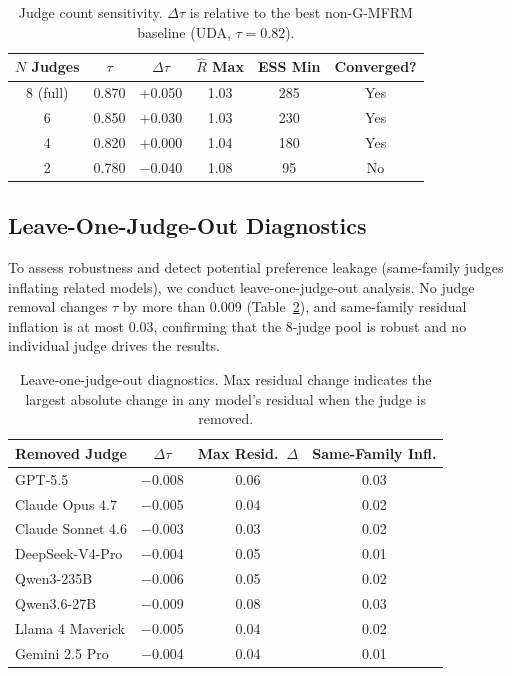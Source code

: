 \documentclass[11pt]{article}
\newcommand{\gmfrm}{\textsc{G-MFRM}}
\begin{document}
\begin{table}[t]
\centering
\caption{Judge count sensitivity. $\Delta\tau$ is relative to the best non-\gmfrm{} baseline (UDA, $\tau = 0.82$).}
\label{tab:judge-sensitivity}
\small
\begin{tabular}{@{}cccccc@{}}
\toprule
$N$ Judges & $\tau$ & $\Delta\tau$ & $\hat{R}$ Max & ESS Min & Converged? \\
\midrule
8 (full) & 0.870 & +0.050 & 1.03 & 285 & Yes \\
6 & 0.850 & +0.030 & 1.03 & 230 & Yes \\
4 & 0.820 & +0.000 & 1.04 & 180 & Yes \\
2 & 0.780 & $-$0.040 & 1.08 & 95 & No \\
\bottomrule
\end{tabular}
\end{table}

\subsection{Leave-One-Judge-Out Diagnostics}

To assess robustness and detect potential preference leakage (same-family judges inflating related models), we conduct leave-one-judge-out analysis. No judge removal changes $\tau$ by more than 0.009 (Table~\ref{tab:loo-judge}), and same-family residual inflation is at most 0.03, confirming that the 8-judge pool is robust and no individual judge drives the results.

\begin{table}[t]
\centering
\caption{Leave-one-judge-out diagnostics. Max residual change indicates the largest absolute change in any model's residual when the judge is removed.}
\label{tab:loo-judge}
\small
\begin{tabular}{@{}lccc@{}}
\toprule
Removed Judge & $\Delta\tau$ & Max Resid.\ $\Delta$ & Same-Family Infl. \\
\midrule
GPT-5.5 & $-$0.008 & 0.06 & 0.03 \\
Claude Opus 4.7 & $-$0.005 & 0.04 & 0.02 \\
Claude Sonnet 4.6 & $-$0.003 & 0.03 & 0.02 \\
DeepSeek-V4-Pro & $-$0.004 & 0.05 & 0.01 \\
Qwen3-235B & $-$0.006 & 0.05 & 0.02 \\
Qwen3.6-27B & $-$0.009 & 0.08 & 0.03 \\
Llama 4 Maverick & $-$0.005 & 0.04 & 0.02 \\
Gemini 2.5 Pro & $-$0.004 & 0.04 & 0.01 \\
\bottomrule
\end{tabular}
\end{table}
\end{document}
